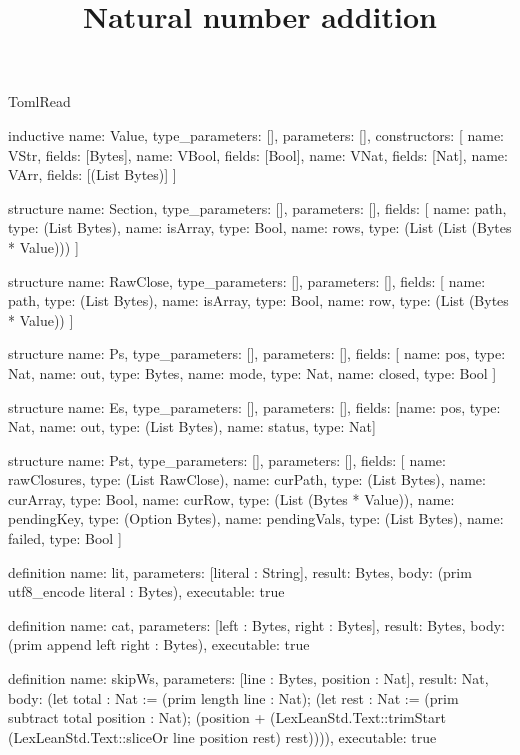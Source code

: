 \begin{lexlean}{TomlRead}
\title{Natural number addition}
\begin{semanticmodule}
inductive{
  name: Value,
  type_parameters: [],
  parameters: [],
  constructors: [
    {name: VStr, fields: [Bytes]},
    {name: VBool, fields: [Bool]},
    {name: VNat, fields: [Nat]},
    {name: VArr, fields: [(List Bytes)]}
  ]
}

structure{
  name: Section,
  type_parameters: [],
  parameters: [],
  fields: [
    {name: path, type: (List Bytes)},
    {name: isArray, type: Bool},
    {name: rows, type: (List (List (Bytes * Value)))}
  ]
}

structure{
  name: RawClose,
  type_parameters: [],
  parameters: [],
  fields: [
    {name: path, type: (List Bytes)},
    {name: isArray, type: Bool},
    {name: row, type: (List (Bytes * Value))}
  ]
}

structure{
  name: Ps,
  type_parameters: [],
  parameters: [],
  fields: [
    {name: pos, type: Nat},
    {name: out, type: Bytes},
    {name: mode, type: Nat},
    {name: closed, type: Bool}
  ]
}

structure{
  name: Es,
  type_parameters: [],
  parameters: [],
  fields: [{name: pos, type: Nat}, {name: out, type: (List Bytes)}, {name: status, type: Nat}]
}

structure{
  name: Pst,
  type_parameters: [],
  parameters: [],
  fields: [
    {name: rawClosures, type: (List RawClose)},
    {name: curPath, type: (List Bytes)},
    {name: curArray, type: Bool},
    {name: curRow, type: (List (Bytes * Value))},
    {name: pendingKey, type: (Option Bytes)},
    {name: pendingVals, type: (List Bytes)},
    {name: failed, type: Bool}
  ]
}

definition{
  name: lit,
  parameters: [literal : String],
  result: Bytes,
  body: (prim utf8_encode literal : Bytes),
  executable: true
}

definition{
  name: cat,
  parameters: [left : Bytes, right : Bytes],
  result: Bytes,
  body: (prim append left right : Bytes),
  executable: true
}

definition{
  name: skipWs,
  parameters: [line : Bytes, position : Nat],
  result: Nat,
  body: (let total : Nat := (prim length line : Nat); (let rest : Nat := (prim subtract total position : Nat); (position + (LexLeanStd.Text::trimStart (LexLeanStd.Text::sliceOr line position rest) rest)))),
  executable: true
}


\end{semanticmodule}
\end{lexlean}
